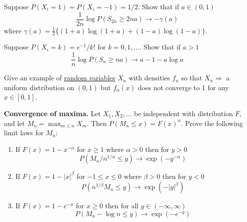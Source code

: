   \begin{exercise}[Durrett 3.1.3]
    Suppose $P(X_i = 1) = P(X_i = -1) = 1/2$. Show that if $a \in (0, 1)$
    \begin{equation*}
      \frac{1}{2n} \log P(S_{2n} \geq 2na) \to -\gamma(a)
    \end{equation*}
    where $\gamma(a) = \frac{1}{2}\{(1 + a) \log(1 + a) + (1 - a) \log(1 - a)\}$.
  \end{exercise}
  \begin{solution}

  \end{solution}

  \begin{exercise}[Durrett 3.1.4]
    Suppose $P(X_i = k) = e^{-1}/k!$ for $k = 0, 1, \dots$. Show that if $a > 1$
    \begin{equation*}
      \frac{1}{n} \log P(S_n \geq na) \to a - 1 - a \log a
    \end{equation*}
  \end{exercise}
  \begin{solution}

  \end{solution}

  \begin{exercise}[Durrett 3.2.1]
    Give an example of \hyperref[def:random-variable]{random variables} $X_n$ with densities $f_n$ so that $X_n \Rightarrow$ a uniform distribution on $(0,1)$ but $f_n(x)$ does not converge to 1 for any $x \in [0, 1]$.
  \end{exercise}
  \begin{solution}

  \end{solution}

  \begin{exercise}[Durrett 3.2.2]
    \textbf{Convergence of maxima.} Let $X_1, X_2, \dots$ be independent with distribution $F$, and let $M_n = \max_{m \leq n} X_m$. Then $P(M_n \leq x) = F(x)^n$. Prove the following limit laws for $M_n$:
    \begin{enumerate}
      \item If $F(x) = 1 - x^{-\alpha}$ for $x \geq 1$ where $\alpha > 0$ then for $y > 0$
      \begin{equation*}
        P(M_n/n^{1/\alpha} \leq y) \to \exp(-y^{-\alpha})
      \end{equation*}
      \item If $F(x) = 1 - |x|^\beta$ for $-1 \leq x \leq 0$ where $\beta > 0$ then for $y < 0$
      \begin{equation*}
        P(n^{1/\beta} M_n \leq y) \to \exp(-|y|^\beta)
      \end{equation*}
      \item If $F(x) = 1 - e^{-x}$ for $x \geq 0$ then for all $y \in (-\infty, \infty)$
      \begin{equation*}
        P(M_n - \log n \leq y) \to \exp(-e^{-y})
      \end{equation*}
    \end{enumerate}
  \end{exercise}
  \begin{solution}

  \end{solution}

